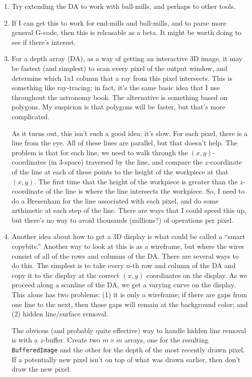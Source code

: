 \documentclass[titlepage,oneside,10pt]{article}
\begin{document}
\begin{enumerate}
  (like a cheap Dell) have graphics cards? If not, then it makes sense
  to postpone implementing anything the relies on the presence of a
  graphics card.
\item Try extending the DA to work with ball-mills, and perhaps to
  other tools.
\item If I can get this to work for end-mills and ball-mills, and to
  parse more general G-code, then this is releasable as a beta. It
  might be worth doing to see if there's interest.
\item For a depth array (DA), as a way of getting an interactive 3D
  image, it may be fastest (and simplest) to scan
  every pixel of the output window, and determine which 1x1 column
  that a ray from this pixel intersects. This is something like
  ray-tracing; in fact, it's the same basic idea that I use throughout
  the astronomy book. The alternative is something
  based on polygons. My suspicion is that polygons will be faster, but
  that's more complicated.

As it turns out, this isn't such a good idea; it's slow. For each
pixel, there is a line from the eye. All of these lines are parallel,
but that doesn't help. The problem is that for each line, we need to
walk through the $(x,y)$-coordinates (in 3-space) traversed by the line,
and compare the $z$-coordinate of the line at each of these points to
the height of the workpiece at that $(x,y)$. The first time that the
height of the workpiece is greater than the $z$-coordinate of the line
is where the line intersects the workpiece. So, I need to do a
Bresenham for the line associated with each pixel, and do some
arthimetic at each step of the line. There are ways that I could speed
this up, but there's no way to avoid thousands (millions?) of
operations per pixel.
\item Another idea about how to get a 3D display is what could be
  called a ``smart copybits.'' Another way to look at this is as a
  wireframe, but where the wires consist of all of the rows and
  columns of the DA. There are several ways to do this. The simplest
  is to take every $n$-th row and column of the DA and copy it to the
  display at the correct $(x,y)$ coordinates on the display. As we
  proceed along a scanline of the DA, we get a varying curve on the
  display. This alone has two problems: (1) it is only a wireframe; if
  there are gaps from one line to the next, then those gaps will
  remain at the background color; and (2) hidden line/surface removal.

The obvious (and probably quite effective) way to handle hidden line
removal is with a $z$-buffer. Create two $m\times m$ arrays, one for
the resulting {\tt BufferedImage} and the other for the depth of the
most recently drawn pixel. If a potentially new pixel isn't on top of
what was drawn earlier, then don't draw the new pixel.


\end{enumerate}
\end{document}
